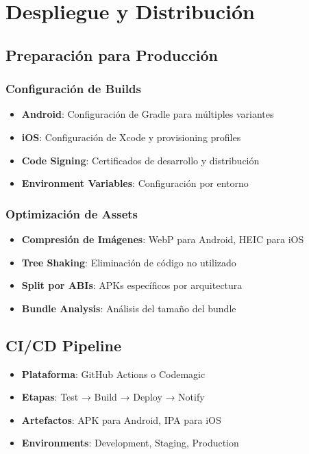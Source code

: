\documentclass[12pt]{article}
\begin{document}
\section{Despliegue y Distribución}
\label{sec:despliegue}

\subsection{Preparación para Producción}

\subsubsection{Configuración de Builds}
\begin{itemize}
    \item \textbf{Android}: Configuración de Gradle para múltiples variantes
    \item \textbf{iOS}: Configuración de Xcode y provisioning profiles
    \item \textbf{Code Signing}: Certificados de desarrollo y distribución
    \item \textbf{Environment Variables}: Configuración por entorno
\end{itemize}

\subsubsection{Optimización de Assets}
\begin{itemize}
    \item \textbf{Compresión de Imágenes}: WebP para Android, HEIC para iOS
    \item \textbf{Tree Shaking}: Eliminación de código no utilizado
    \item \textbf{Split por ABIs}: APKs específicos por arquitectura
    \item \textbf{Bundle Analysis}: Análisis del tamaño del bundle
\end{itemize}

\subsection{CI/CD Pipeline}
\begin{itemize}
    \item \textbf{Plataforma}: GitHub Actions o Codemagic
    \item \textbf{Etapas}: Test → Build → Deploy → Notify
    \item \textbf{Artefactos}: APK para Android, IPA para iOS
    \item \textbf{Environments}: Development, Staging, Production
\end{itemize}
\end{document}
